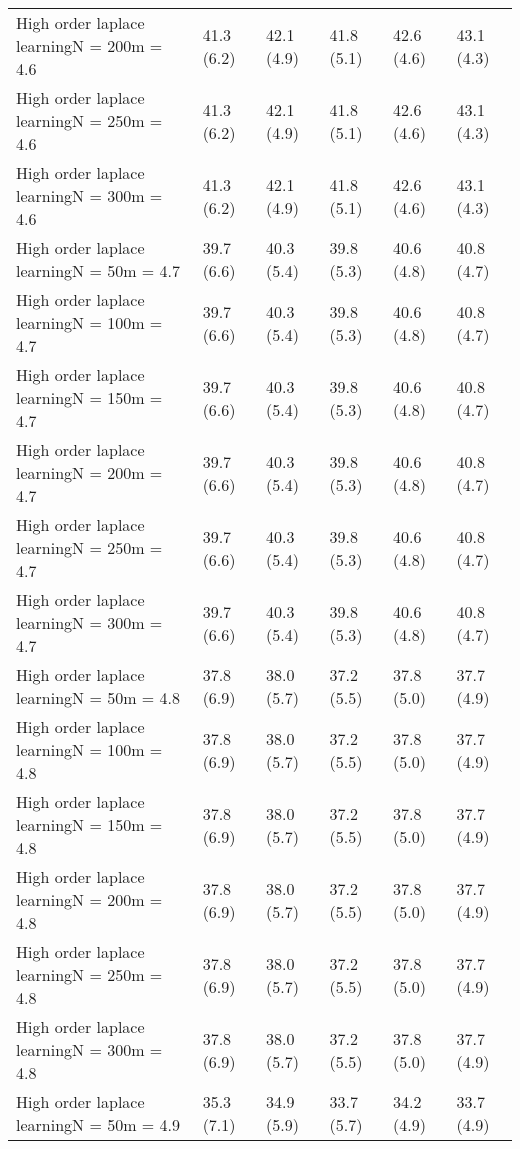 \documentclass{article}
\begin{document}
\begin{table*}[t!]
\begin{center}
\begin{small}
\begin{sc}
\begin{tabular}{llllll}
High order laplace learningN = 200m = 4.6&41.3 (6.2)      &42.1 (4.9)      &41.8 (5.1)      &42.6 (4.6)      &43.1 (4.3)      \\
High order laplace learningN = 250m = 4.6&41.3 (6.2)      &42.1 (4.9)      &41.8 (5.1)      &42.6 (4.6)      &43.1 (4.3)      \\
High order laplace learningN = 300m = 4.6&41.3 (6.2)      &42.1 (4.9)      &41.8 (5.1)      &42.6 (4.6)      &43.1 (4.3)      \\
High order laplace learningN = 50m = 4.7&39.7 (6.6)      &40.3 (5.4)      &39.8 (5.3)      &40.6 (4.8)      &40.8 (4.7)      \\
High order laplace learningN = 100m = 4.7&39.7 (6.6)      &40.3 (5.4)      &39.8 (5.3)      &40.6 (4.8)      &40.8 (4.7)      \\
High order laplace learningN = 150m = 4.7&39.7 (6.6)      &40.3 (5.4)      &39.8 (5.3)      &40.6 (4.8)      &40.8 (4.7)      \\
High order laplace learningN = 200m = 4.7&39.7 (6.6)      &40.3 (5.4)      &39.8 (5.3)      &40.6 (4.8)      &40.8 (4.7)      \\
High order laplace learningN = 250m = 4.7&39.7 (6.6)      &40.3 (5.4)      &39.8 (5.3)      &40.6 (4.8)      &40.8 (4.7)      \\
High order laplace learningN = 300m = 4.7&39.7 (6.6)      &40.3 (5.4)      &39.8 (5.3)      &40.6 (4.8)      &40.8 (4.7)      \\
High order laplace learningN = 50m = 4.8&37.8 (6.9)      &38.0 (5.7)      &37.2 (5.5)      &37.8 (5.0)      &37.7 (4.9)      \\
High order laplace learningN = 100m = 4.8&37.8 (6.9)      &38.0 (5.7)      &37.2 (5.5)      &37.8 (5.0)      &37.7 (4.9)      \\
High order laplace learningN = 150m = 4.8&37.8 (6.9)      &38.0 (5.7)      &37.2 (5.5)      &37.8 (5.0)      &37.7 (4.9)      \\
High order laplace learningN = 200m = 4.8&37.8 (6.9)      &38.0 (5.7)      &37.2 (5.5)      &37.8 (5.0)      &37.7 (4.9)      \\
High order laplace learningN = 250m = 4.8&37.8 (6.9)      &38.0 (5.7)      &37.2 (5.5)      &37.8 (5.0)      &37.7 (4.9)      \\
High order laplace learningN = 300m = 4.8&37.8 (6.9)      &38.0 (5.7)      &37.2 (5.5)      &37.8 (5.0)      &37.7 (4.9)      \\
High order laplace learningN = 50m = 4.9&35.3 (7.1)      &34.9 (5.9)      &33.7 (5.7)      &34.2 (4.9)      &33.7 (4.9)      \\

\end{tabular}
\end{sc}
\end{small}
\end{center}
\end{table*}
\end{document}
